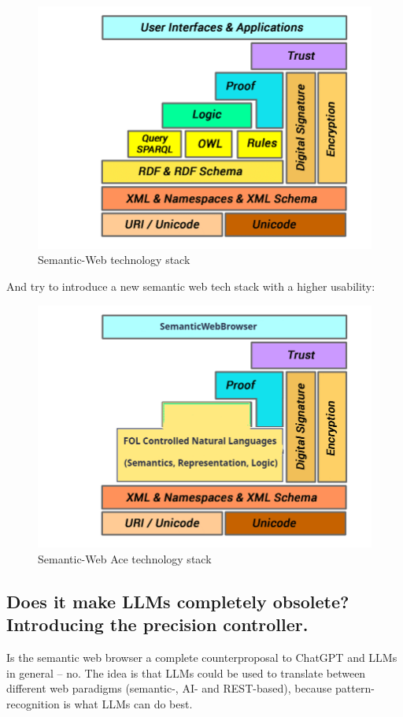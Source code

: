 \documentclass[12pt,a4paper]{article}
\begin{document}
\begin{figure}[h]
    \includegraphics[width=12cm]{Semantic-Web-technology-stack}
    \caption{Semantic-Web technology stack}
\end{figure}

And try to introduce a new semantic web tech stack with a higher usability:

\begin{figure}[h]
    \includegraphics[width=12cm]{Semantic-Web-technology-ace-stack}
    \caption{Semantic-Web Ace technology stack}
\end{figure}

\subsection{Does it make LLMs completely obsolete? Introducing the precision controller.}

Is the semantic web browser a complete counterproposal to ChatGPT and LLMs in general -- no. The idea is that LLMs could be used to translate between different web paradigms (semantic-, AI- and REST-based), because pattern-recognition is what LLMs can do best.
\end{document}
